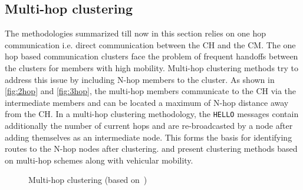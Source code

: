 \documentclass[]{ccs-thesis}
\begin{document}
\subsection{Multi-hop clustering}

The methodologies summarized till now in this section relies on one hop communication i.e. direct communication between
the \ac{CH} and the \ac{CM}. The one hop based communication clusters face the problem of frequent handoffs between
the clusters for members with high mobility. Multi-hop clustering methods try to address this issue by including N-hop
members to the cluster. As shown in \ref{fig:2hop} and \ref{fig:3hop}, the multi-hop members communicate to the \ac{CH}
via the intermediate members and can be located a maximum of N-hop distance away from the \ac{CH}. In a multi-hop
clustering methodology, the \texttt{HELLO} messages contain additionally the number of current hops and are re-broadcasted
by a node after adding themselves as an intermediate node. This forms the basis for identifying routes to the N-hop nodes
after clustering. \textcite{Zhang2069135} and \textcite{6554933} present clustering methods based on multi-hop schemes
along with vehicular mobility.


\begin{figure}[h]%
    \centering
    \hfill%
    \hfill%
    \caption{Multi-hop clustering (based on~\cite[Figure~1]{6554933})}%
    \label{fig:multihop}%
\end{figure}
\end{document}
